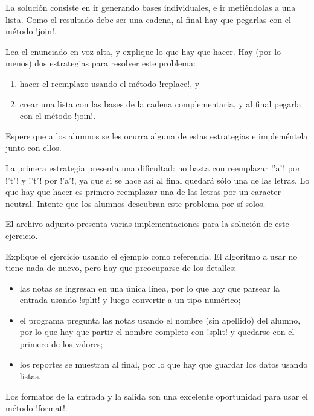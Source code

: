 \documentclass[10pt]{article}
\begin{document}
  La solución consiste en ir generando bases individuales,
  e ir metiéndolas a una lista.
  Como el resultado debe ser una cadena,
  al final hay que pegarlas con el método \li!join!.


  Lea el enunciado en voz alta, y explique lo que hay que hacer.
  Hay (por lo menos) dos estrategias para resolver este problema:
  \begin{enumerate}
    \item hacer el reemplazo usando el método \li!replace!, y
    \item crear una lista con las bases de la cadena complementaria,
      y al final pegarla con el método \li!join!.
  \end{enumerate}

  Espere que a los alumnos se les ocurra alguna de estas estrategias
  e impleméntela junto con ellos.

  La primera estrategia presenta una dificultad:
  no basta con reemplazar \li!'a'! por \li!'t'! y \li!'t'! por \li!'a'!,
  ya que si se hace así al final quedará sólo una de las letras.
  Lo que hay que hacer es primero reemplazar una de las letras por un caracter neutral.
  Intente que los alumnos descubran este problema por sí solos.

  El archivo adjunto presenta varias implementaciones para la solución de este ejercicio.


  Explique el ejercicio usando el ejemplo como referencia.
  El algoritmo a usar no tiene nada de nuevo,
  pero hay que preocuparse de los detalles:
  \begin{itemize}
    \item las notas se ingresan en una única línea,
      por lo que hay que parsear la entrada
      usando \li!split! y luego convertir a un tipo numérico;
    \item el programa pregunta las notas
      usando el nombre (sin apellido) del alumno,
      por lo que hay que partir el nombre completo con \li!split!
      y quedarse con el primero de los valores;
    \item los reportes se muestran al final,
      por lo que hay que guardar los datos usando listas.
  \end{itemize}

  Los formatos de la entrada y la salida
  son una excelente oportunidad para usar el método \li!format!.
\end{document}
